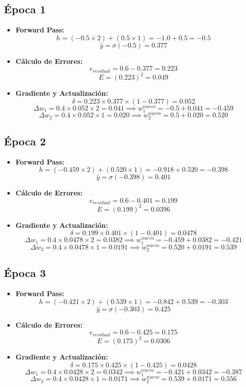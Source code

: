 \documentclass[12pt]{article}
\begin{document}
\subsection{Época 1}
\begin{itemize}
    \item \textbf{Forward Pass:}
    \[ h = (-0.5 \times 2) + (0.5 \times 1) = -1.0 + 0.5 = -0.5 \]
    \[ \hat{y} = \sigma(-0.5) = 0.377 \]
    \item \textbf{Cálculo de Errores:}
    \[ e_{residual} = 0.6 - 0.377 = 0.223 \]
    \[ E = (0.223)^2 = 0.049 \]
    \item \textbf{Gradiente y Actualización:}
    \[ \delta = 0.223 \times 0.377 \times (1 - 0.377) = 0.052 \]
    \[ \Delta w_1 = 0.4 \times 0.052 \times 2 = 0.041 \implies w_1^{nuevo} = -0.5 + 0.041 = -0.459 \]
    \[ \Delta w_2 = 0.4 \times 0.052 \times 1 = 0.020 \implies w_2^{nuevo} = 0.5 + 0.020 = 0.520 \]
\end{itemize}

\subsection{Época 2}
\begin{itemize}
    \item \textbf{Forward Pass:}
    \[ h = (-0.459 \times 2) + (0.520 \times 1) = -0.918 + 0.520 = -0.398 \]
    \[ \hat{y} = \sigma(-0.398) = 0.401 \]
    \item \textbf{Cálculo de Errores:}
    \[ e_{residual} = 0.6 - 0.401 = 0.199 \]
    \[ E = (0.199)^2 = 0.0396 \]
    \item \textbf{Gradiente y Actualización:}
    \[ \delta = 0.199 \times 0.401 \times (1 - 0.401) = 0.0478 \]
    \[ \Delta w_1 = 0.4 \times 0.0478 \times 2 = 0.0382 \implies w_1^{nuevo} = -0.459 + 0.0382 = -0.421 \]
    \[ \Delta w_2 = 0.4 \times 0.0478 \times 1 = 0.0191 \implies w_2^{nuevo} = 0.520 + 0.0191 = 0.539 \]
\end{itemize}

\subsection{Época 3}
\begin{itemize}
    \item \textbf{Forward Pass:}
    \[ h = (-0.421 \times 2) + (0.539 \times 1) = -0.842 + 0.539 = -0.303 \]
    \[ \hat{y} = \sigma(-0.303) = 0.425 \]
    \item \textbf{Cálculo de Errores:}
    \[ e_{residual} = 0.6 - 0.425 = 0.175 \]
    \[ E = (0.175)^2 = 0.0306 \]
    \item \textbf{Gradiente y Actualización:}
    \[ \delta = 0.175 \times 0.425 \times (1 - 0.425) = 0.0428 \]
    \[ \Delta w_1 = 0.4 \times 0.0428 \times 2 = 0.0342 \implies w_1^{nuevo} = -0.421 + 0.0342 = -0.387 \]
    \[ \Delta w_2 = 0.4 \times 0.0428 \times 1 = 0.0171 \implies w_2^{nuevo} = 0.539 + 0.0171 = 0.556 \]
\end{itemize}
\end{document}
